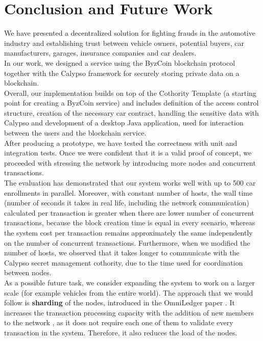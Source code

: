 \section{Conclusion and Future Work}

We have presented a decentralized solution for fighting frauds in the automotive industry and establishing trust between vehicle owners, potential buyers, car manufacturers, garages, insurance companies and car dealers.\\
\newline
In our work, we designed a service using the ByzCoin \cite{ByzCoin} blockchain protocol together with the Calypso \cite{Calypso} framework for securely storing private data on a blockchain.\\
\newline
Overall, our implementation builds on top of the Cothority Template \cite{Template} (a starting point for creating a ByzCoin service) and includes definition of the access control structure, creation of the necessary car contract, handling the sensitive data with Calypso and development of a desktop Java application, used for interaction between the users and the blockchain service.\\
\newline
After producing a prototype, we have tested the correctness with unit and integration tests. Once we were confident that it is a valid proof of concept, we proceeded with stressing the network by introducing more nodes and concurrent transactions.\\
\newline
The evaluation has demonstrated that our system works well with up to 500 car enrollments in parallel. Moreover, with constant number of hosts, the wall time (number of seconds it takes in real life, including the network communication) calculated per transaction is  greater  when  there  are  lower  number  of  concurrent  transactions, because the block creation  time  is  equal in every scenario, whereas the system cost per transaction remains approximately the same independently on the number of concurrent transactions.
\newline
Furthermore, when we modified the number of hosts, we observed that it takes longer to communicate with the Calypso secret management cothority, due to the time used for coordination between nodes.\\
\newline
As a possible future task, we consider expanding the system to work on a larger scale (for example vehicles from the entire world). The approach that we would follow is \textbf{sharding} of the nodes, introduced in the OmniLedger paper \cite{OmniLedger}. It increases the transaction processing capacity with the addition of new members to the network \cite{OmniLedger}, as it does not require each one of them to validate every transaction in the system. Therefore, it also reduces the load of the nodes.
